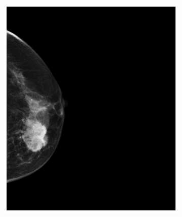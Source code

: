 \documentclass[a4paper,10pt]{book}
\begin{document}
\begin{figure}[h!]
    \centering
    \begin{subfigure}[t]{0.35\textwidth}
        \centering
        \includegraphics[width=\textwidth]{reports//assets/preprocess_a.png}
        \caption{}
        \label{fig:pre_original}
    \end{subfigure}
    \begin{subfigure}[t]{0.15\textwidth}
        \centering

\end{subfigure}
\end{figure}
\end{document}
